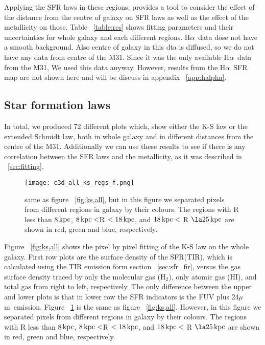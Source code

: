 \documentclass[useAMS,usenatbib]{mn2e}
\newcommand \kpc        {\,{\rm kpc}}
\newcommand \halpha    {H$\alpha $\ }
\newcommand \um    {$\mu$m\ }
\begin{document}
Applying the SFR laws in these regions, provides a tool to consider the effect of the distance from the centre of galaxy on SFR laws as well as the effect of the metallicity on those. Table ~\ref{table:res} shows fitting parameters and their uncertainties for whole galaxy and each different regions. \halpha data dose not have a smooth background. Also centre of galaxy in this dta is diffused, so we do not have any data from centre of the M31. Since it was the only available \halpha data from the M31, We used this data anyway. However, results from the \halpha SFR map are not shown here and will be discuss in appendix ~\ref{app:halpha}. %

\subsection{Star formation laws}
In total, we produced 72 different plots which, show either the K-S law or the extended Schmidt law, both in whole galaxy and in different distances from the centre of the M31. Additionally we can use these results to see if there is any correlation  between the SFR laws and the metallicity, as it was described in ~\ref{sec:fitting}.
  

\begin{figure*}
\texttt{[image: c3d\_all\_ks\_regs\_f.png]}
\caption{same as figure ~\ref{fig:ks,all}, but in this figure we separated pixels from different regions in galaxy by their colours. The regions with R less than 8$\kpc$, $8\kpc < $R $< 18\kpc$, and $18\kpc <$ R $\la 25\kpc$ are shown in red, green and blue, respectively.}
\label{fig:ks,regs}
\end{figure*}


Figure ~\ref{fig:ks,all} shows the pixel by pixel fitting of the K-S law on the whole galaxy. First row plots are the surface density of the SFR(TIR), which is calculated using  the TIR emission form section ~\ref{sec:sfr_fir}, versus the gas surface density traced by only the molecular gas (H$_2$),  only atomic gas (HI), and total gas from right to left, respectively. The only difference between the upper and lower plots is that in lower row the SFR indicators is the FUV plus 24\um emission. Figure ~\ref{fig:ks,regs} is the same as figure ~\ref{fig:ks,all}. However, in this figure we separated pixels from different regions in galaxy by their colours. The regions with R less than 8$\kpc$, $8\kpc < $R $< 18\kpc$, and $18\kpc <$ R $\la 25\kpc$ are shown in red, green and blue, respectively. 
\end{document}
